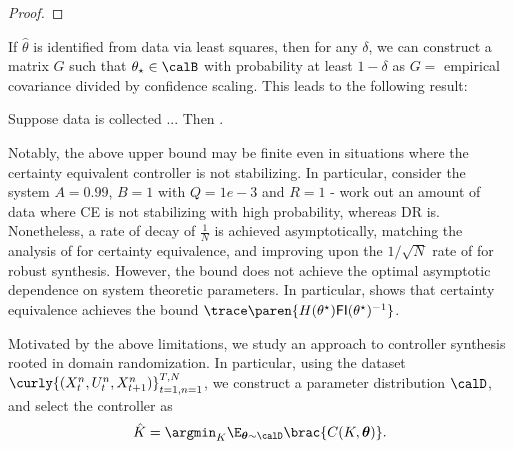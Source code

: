 \begin{proof}
\end{proof}

If $\hat \theta$ is identified from data via least squares, then for any $\delta$, we can construct a matrix $G$ such that $\theta_\star \in \calB$ with probability at least $1-\delta$ as $G = $ empirical covariance divided by confidence scaling. This leads to the following result:
\begin{theorem}
Suppose data is collected ... Then .
\end{theorem}
Notably, the above upper bound may be finite even in situations where the certainty equivalent controller is not stabilizing. In particular, consider the system $A = 0.99$, $B = 1$ with $Q= 1e-3$ and $R=1$ - {\color{red} work out an amount of data where CE is not stabilizing with high probability, whereas DR is.} Nonetheless, a rate of decay of $\frac{1}{N}$ is achieved asymptotically, matching the analysis of \citet{mania2019certainty} for certainty equivalence, and improving upon the $1/\sqrt{N}$ rate of \citet{dean2020sample} for robust synthesis. However, the bound does not achieve the optimal asymptotic dependence on system theoretic parameters. In particular,  shows that certainty equivalence achieves the bound $\trace\paren{H(\theta^\star) \mathsf{FI}(\theta^\star)^{-1}}$.

Motivated by the above limitations, we study an approach to controller synthesis rooted in domain randomization. In particular, using the dataset $\curly{(X_t^n, U_t^n, X_{t+1}^n)}_{t=1, n=1}^{T,N}$, we construct a parameter distribution $\calD$, and select the controller as
\begin{align}
    \label{eq: domain randomization}
    \hat K = \argmin_{K} \E_{\boldsymbol \theta \sim \calD} \brac{C(K, \boldsymbol \theta)}. 
\end{align}

